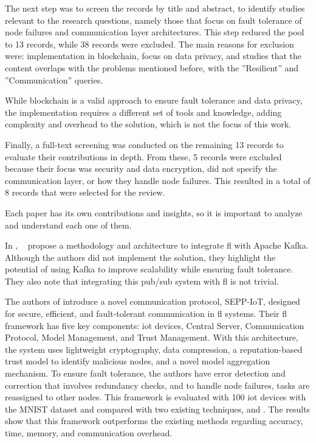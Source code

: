 The next step was to screen the records by title and abstract, to identify studies relevant to the research questions, namely those that focus on fault tolerance of node failures and communication layer architectures. This step reduced the pool to 13 records, while 38 records were excluded. The main reasons for exclusion were: implementation in blockchain, focus on data privacy, and studies that the content overlaps with the problems mentioned before, with the ''Resilient'' and ''Communication'' queries.

While blockchain is a valid approach to ensure fault tolerance and data privacy, the implementation requires a different set of tools and knowledge, adding complexity and overhead to the solution, which is not the focus of this work. 

Finally, a full-text screening was conducted on the remaining 13 records to evaluate their contributions in depth. From these, 5 records were excluded because their focus was security and data encryption, did not specify the communication layer, or how they handle node failures. This resulted in a total of 8 records that were selected for the review.

Each paper has its own contributions and insights, so it is important to analyze and understand each one of them.

In \cite{Bano2021410}, ~\citeauthor{Bano2021410} propose a methodology and architecture to integrate \ac{fl} with Apache Kafka. Although the authors did not implement the solution, they highlight the potential of using Kafka to improve  scalability while ensuring fault tolerance. They also note that integrating this pub/sub system with \ac{fl} is not trivial.

The authors of \cite{Awan2023120918} introduce a novel communication protocol, SEPP-IoT, designed for secure, efficient, and fault-tolerant communication in \ac{fl} systems. Their \ac{fl} framework has five key components: \ac{iot} devices, Central Server, Communication Protocol, Model Management, and Trust Management. With this architecture, the system uses lightweight cryptography, data compression, a reputation-based trust model to identify malicious nodes, and a novel model aggregation mechanism. To ensure fault tolerance, the authors have error detection and correction that involves redundancy checks, and to handle node failures, tasks are reassigned to other nodes. This framework is evaluated with 100 \ac{iot} devices with the MNIST dataset and compared with two existing techniques, \cite{stergiou2023security} and \cite{venu2022secure}. The results show that this framework outperforms the existing methods regarding accuracy, time, memory, and communication overhead.

